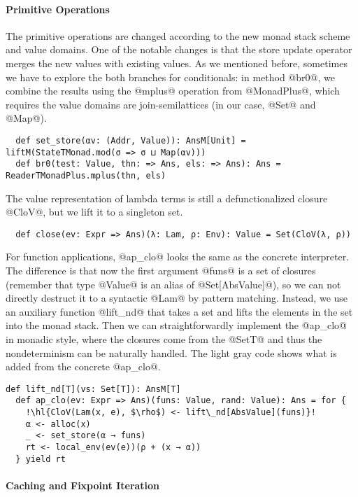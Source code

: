 \paragraph{Primitive Operations} The primitive operations are changed according to
the new monad stack scheme and value domains. One of the notable changes is
that the store update operator merges the new values with existing values.
As we mentioned before, sometimes we have to explore the both branches for
conditionals: in method @br0@, we combine the results using the @mplus@
operation from @MonadPlus@, which requires the value domains are
join-semilattices (in our case, @Set@ and @Map@).
\begin{lstlisting}
  def set_store(αv: (Addr, Value)): AnsM[Unit] = liftM(StateTMonad.mod(σ => σ ⊔ Map(αv)))
  def br0(test: Value, thn: => Ans, els: => Ans): Ans = ReaderTMonadPlus.mplus(thn, els)
\end{lstlisting}

The value representation of lambda terms is still a defunctionalized closure
@CloV@, but we lift it to a singleton set.
\begin{lstlisting}
  def close(ev: Expr => Ans)(λ: Lam, ρ: Env): Value = Set(CloV(λ, ρ))
\end{lstlisting}

For function applications, @ap_clo@ looks the same as the concrete interpreter.
The difference is that now the first argument @funs@ is a set of closures (remember
that type @Value@ is an alias of @Set[AbsValue]@), so we can not directly
destruct it to a syntactic @Lam@ by pattern matching. Instead, we use an
auxiliary function @lift_nd@ that takes a set and lifts the elements in the set
into the monad stack. Then we can straightforwardly implement the @ap_clo@ in
monadic style, where the closures come from the @SetT@ and thus the
nondeterminism can be naturally handled. The light gray code shows what is
added from the concrete
@ap_clo@.
\begin{lstlisting}[escapechar=!]
  def lift_nd[T](vs: Set[T]): AnsM[T]
  def ap_clo(ev: Expr => Ans)(funs: Value, rand: Value): Ans = for {
    !\hl{CloV(Lam(x, e), $\rho$) <- lift\_nd[AbsValue](funs)}!
    α <- alloc(x)
    _ <- set_store(α → funs)
    rt <- local_env(ev(e))(ρ + (x → α))
  } yield rt
\end{lstlisting}

\paragraph{Caching and Fixpoint Iteration}

